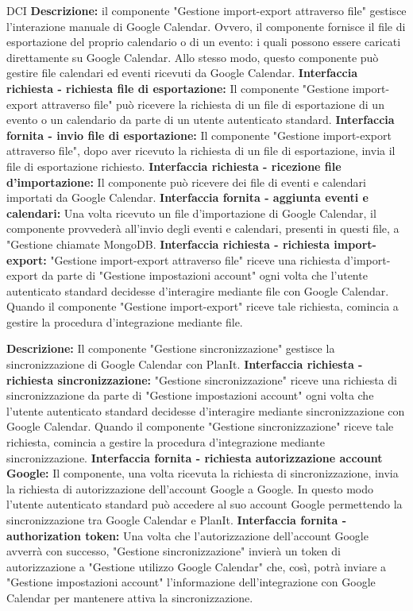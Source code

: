 \begin{listaPersonale}{DCI}
    \textbf{Descrizione:} il componente "Gestione import-export attraverso file" gestisce l'interazione manuale di Google Calendar. Ovvero, il componente fornisce il file di esportazione del proprio calendario o di un evento: i quali possono essere caricati direttamente su Google Calendar. Allo stesso modo, questo componente può gestire file calendari ed eventi ricevuti da Google Calendar.
    \textbf{Interfaccia richiesta - richiesta file di esportazione:} Il componente "Gestione import-export attraverso file" può ricevere la richiesta di un file di esportazione di un evento o un calendario da parte di un utente autenticato standard.
    \textbf{Interfaccia fornita - invio file di esportazione:} Il componente "Gestione import-export attraverso file", dopo aver ricevuto la richiesta di un file di esportazione, invia il file di esportazione richiesto.
    \textbf{Interfaccia richiesta - ricezione file d'importazione:} Il componente può ricevere dei file di eventi e calendari importati da Google Calendar.
    \textbf{Interfaccia fornita - aggiunta eventi e calendari:} Una volta ricevuto un file d'importazione di Google Calendar, il componente provvederà all'invio degli eventi e calendari, presenti in questi file, a "Gestione chiamate MongoDB.
    \textbf{Interfaccia richiesta - richiesta import-export:} "Gestione import-export attraverso file" riceve una richiesta d'import-export da parte di "Gestione impostazioni account" ogni volta che l'utente autenticato standard decidesse d'interagire mediante file con Google Calendar. Quando il componente "Gestione import-export" riceve tale richiesta, comincia a gestire la procedura d'integrazione mediante file.


    \textbf{Descrizione:}   Il componente "Gestione sincronizzazione" gestisce la sincronizzazione di Google Calendar con PlanIt.
    \textbf{Interfaccia richiesta - richiesta sincronizzazione:} "Gestione sincronizzazione" riceve una richiesta di sincronizzazione da parte di "Gestione impostazioni account" ogni volta che l'utente autenticato standard decidesse d'interagire mediante sincronizzazione con Google Calendar. Quando il componente "Gestione sincronizzazione" riceve tale richiesta, comincia a gestire la procedura d'integrazione mediante sincronizzazione.
    \textbf{Interfaccia fornita - richiesta autorizzazione account Google:} Il componente, una volta ricevuta la richiesta di sincronizzazione, invia la richiesta di autorizzazione dell'account Google a Google. In questo modo l'utente autenticato standard può accedere al suo account Google permettendo la sincronizzazione tra Google Calendar e PlanIt.
    \textbf{Interfaccia fornita - authorization token:} Una volta che l'autorizzazione dell'account Google avverrà con successo, "Gestione sincronizzazione" invierà un token di autorizzazione a "Gestione utilizzo Google Calendar" che, così, potrà inviare a "Gestione impostazioni account" l'informazione dell'integrazione con Google Calendar per mantenere attiva la sincronizzazione.



\end{listaPersonale}
